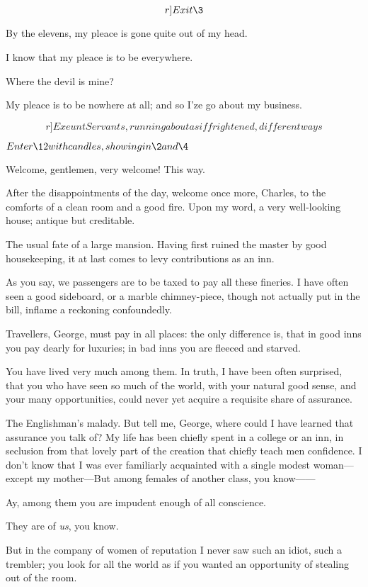 \documentclass{book}
\begin{document}
\[r]Exit \3\]

\6  By the elevens, my pleace is gone quite out of my head.

  I know that my pleace is to be everywhere.

  Where the devil is mine?

  My pleace is to be nowhere at all; and so I'ze go
about my business.

\[r]Exeunt Servants, running about as if frightened, different ways\]


\(Enter \12 with candles, showing in \2 and \4\)


  Welcome, gentlemen, very welcome!  This way.

\4  After the disappointments of the day, welcome once more,
Charles, to the comforts of a clean room and a good fire.  Upon my
word, a very well-looking house; antique but creditable.

\2  The usual fate of a large mansion.  Having first ruined the
master by good housekeeping, it at last comes to levy contributions as
an inn.

\4  As you say, we passengers are to be taxed to pay all these
fineries.  I have often seen a good sideboard, or a marble
chimney-piece, though not actually put in the bill, inflame a
reckoning confoundedly.

\2  Travellers, George, must pay in all places: the only
difference is, that in good inns you pay dearly for luxuries; in bad
inns you are fleeced and starved.

\4  You have lived very much among them.  In truth, I have been
often surprised, that you who have seen so much of the world, with your
natural good sense, and your many opportunities, could never yet
acquire a requisite share of assurance.

\2  The Englishman's malady.  But tell me, George, where could I
have learned that assurance you talk of?  My life has been chiefly
spent in a college or an inn, in seclusion from that lovely part of the
creation that chiefly teach men confidence.  I don't know that I was
ever familiarly acquainted with a single modest woman---except my
mother---But among females of another class, you know------

\4  Ay, among them you are impudent enough of all conscience.

\2  They are of \textit{us}, you know.

\4  But in the company of women of reputation I never saw such
an idiot, such a trembler; you look for all the world as if you wanted
an opportunity of stealing out of the room.
\end{document}

